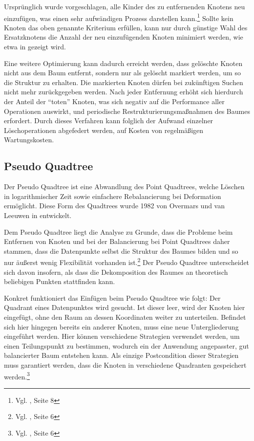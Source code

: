 \documentclass[%
			paper=a4,%
			DIV12,
			liststotoc,
			bibtotoc,
			draft=false,%
			titlepage,
			numbers=noendperiod
			]{scrartcl}
\newcommand{\zit}[3]{#1 \cite{#2}, #3}
\newcommand{\footzit}[3]{\footnote{\zit{#1}{#2}{#3}}}
\begin{document}
Ursprünglich wurde vorgeschlagen, alle Kinder des zu entfernenden Knotens neu einzufügen, was einen sehr aufwändigen Prozess darstellen kann.\footzit{Vgl.}{DBLP:journals/acta/FinkelB74}{Seite 8}
Sollte kein Knoten das oben genannte Kriterium erfüllen, kann nur durch günstige Wahl des Ersatzknotens die Anzahl der neu einzufügenden Knoten minimiert werden, wie etwa in \cite{DBLP:journals/cacm/Samet80a} gezeigt wird.

Eine weitere Optimierung kann dadurch erreicht werden, dass gelöschte Knoten nicht aus dem Baum entfernt, sondern nur als gelöscht markiert werden, um so die Struktur zu erhalten.
Die markierten Knoten dürfen bei zukünftigen Suchen nicht mehr zurückgegeben werden.
Nach jeder Entfernung erhöht sich hierdurch der Anteil der "`toten"' Knoten, was sich negativ auf die Performance aller Operationen auswirkt, und periodische Restrukturierungsmaßnahmen des Baumes erfordert.
Durch dieses Verfahren kann folglich der Aufwand einzelner Löschoperationen abgefedert werden, auf Kosten von regelmäßigen Wartungskosten.

\subsection{Pseudo Quadtree}
\label{sec:pseudoquadtree}
Der Pseudo Quadtree ist eine Abwandlung des Point Quadtrees, welche Löschen in logarithmischer Zeit sowie einfachere Rebalancierung bei Deformation ermöglicht. Diese Form des Quadtrees wurde 1982 von Overmars und van Leeuwen in \cite{DBLP:journals/acta/OvermarsL82} entwickelt.

Dem Pseudo Quadtree liegt die Analyse zu Grunde, dass die Probleme beim Entfernen von Knoten und bei der Balancierung bei Point Quadtrees daher stammen, dass die Datenpunkte selbst die Struktur des Baumes bilden und so nur äußerst wenig Flexibilität vorhanden ist.\footzit{Vgl.}{DBLP:journals/acta/OvermarsL82}{Seite 6}
Der Pseudo Quadtree unterscheidet sich davon insofern, als dass die Dekomposition des Raumes an theoretisch beliebigen Punkten stattfinden kann. 

Konkret funktioniert das Einfügen beim Pseudo Quadtree wie folgt:
Der Quadrant eines Datenpunktes wird gesucht.
Ist dieser leer, wird der Knoten hier eingefügt, ohne den Raum an dessen Koordinaten weiter zu unterteilen.
Befindet sich hier hingegen bereits ein anderer Knoten, muss eine neue Untergliederung eingeführt werden.
Hier können verschiedene Strategien verwendet werden, um einen Teilungspunkt zu bestimmen, wodurch ein der Anwendung angepasster, gut balancierter Baum entstehen kann.
Als einzige Postcondition dieser Strategien muss garantiert werden,
dass die Knoten in verschiedene Quadranten gespeichert werden.\footzit{Vgl.}{DBLP:journals/acta/OvermarsL82}{Seite 6}
\end{document}
